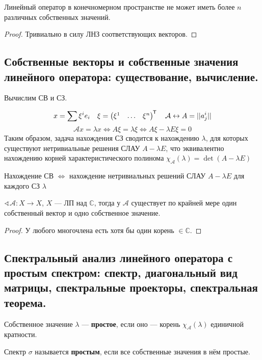 \begin{lemma}
    Линейный оператор в конечномерном пространстве не может иметь более $n$ различных собственных значений.
\end{lemma}
\begin{proof}
    Тривиально в силу ЛНЗ соответствующих векторов.
\end{proof}

\subsection{Собственные векторы и собственные значения линейного оператора: существование, вычисление. }

Вычислим СВ и СЗ.

$$x = \sum \xi^i e_i \quad \xi = \begin{pmatrix}
        \xi^1 & \ldots & \xi^n
    \end{pmatrix}^{\mkern-1.5mu\mathsf{T}} \quad \mathcal A \leftrightarrow A = ||a^i_j||$$
$$\mathcal A x = \lambda x \Leftrightarrow A \xi = \lambda \xi \Leftrightarrow A \xi - \lambda E \xi = 0$$
Таким образом, задача нахождения СЗ сводится к нахождению $\lambda$, для которых существуют нетривиальные решения СЛАУ $A-\lambda E$, что эквивалентно нахождению корней характеристического полинома $\chi_{\mathcal A}(\lambda) = \det(A - \lambda E)$

Нахождение СВ $\Leftrightarrow$ нахождение нетривиальных решений СЛАУ $A - \lambda E$ для каждого СЗ $\lambda$

\begin{lemma}
    $\sphericalangle \mathcal A : X \to X$, $X$ --- ЛП над $\mathbb{C}$, тогда у $\mathcal A$ существует по крайней мере один собственный вектор и одно собственное значение.
\end{lemma}
\begin{proof}
    У любого многочлена есть хотя бы один корень $\in \mathbb{C}$.
\end{proof}

\subsection{Спектральный анализ линейного оператора с простым спектром: спектр, диагональный вид матрицы, спектральные проекторы, спектральная теорема.}
\begin{definition}
    Собственное значение $\lambda$ --- \textbf{простое}, если оно --- корень $\chi_{\mathcal A}(\lambda)$ единичной кратности.
\end{definition}
\begin{definition}
    Спектр $\sigma$ называется \textbf{простым}, если все собственные значения в нём простые.
\end{definition}

